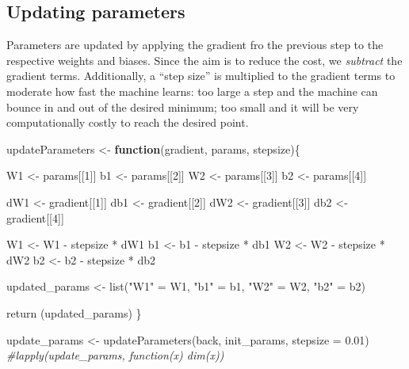 \documentclass[
]{article}
\newenvironment{Shaded}{\begin{snugshade}}{\end{snugshade}}
\newcommand{\AttributeTok}[1]{\textcolor[rgb]{0.77,0.63,0.00}{#1}}
\newcommand{\CommentTok}[1]{\textcolor[rgb]{0.56,0.35,0.01}{\textit{#1}}}
\newcommand{\ControlFlowTok}[1]{\textcolor[rgb]{0.13,0.29,0.53}{\textbf{#1}}}
\newcommand{\DecValTok}[1]{\textcolor[rgb]{0.00,0.00,0.81}{#1}}
\newcommand{\FloatTok}[1]{\textcolor[rgb]{0.00,0.00,0.81}{#1}}
\newcommand{\FunctionTok}[1]{\textcolor[rgb]{0.00,0.00,0.00}{#1}}
\newcommand{\NormalTok}[1]{#1}
\newcommand{\OtherTok}[1]{\textcolor[rgb]{0.56,0.35,0.01}{#1}}
\newcommand{\SpecialCharTok}[1]{\textcolor[rgb]{0.00,0.00,0.00}{#1}}
\newcommand{\StringTok}[1]{\textcolor[rgb]{0.31,0.60,0.02}{#1}}
\begin{document}
\hypertarget{updating-parameters}{%
\subsection{Updating parameters}\label{updating-parameters}}

Parameters are updated by applying the gradient fro the previous step to
the respective weights and biases. Since the aim is to reduce the cost,
we \emph{subtract} the gradient terms. Additionally, a ``step size'' is
multiplied to the gradient terms to moderate how fast the machine
learns: too large a step and the machine can bounce in and out of the
desired minimum; too small and it will be very computationally costly to
reach the desired point.

\begin{Shaded}
\begin{Highlighting}[]
\NormalTok{updateParameters }\OtherTok{\textless{}{-}} \ControlFlowTok{function}\NormalTok{(gradient, params, stepsize)\{}
  
\NormalTok{  W1 }\OtherTok{\textless{}{-}}\NormalTok{ params[[}\DecValTok{1}\NormalTok{]]}
\NormalTok{  b1 }\OtherTok{\textless{}{-}}\NormalTok{ params[[}\DecValTok{2}\NormalTok{]]}
\NormalTok{  W2 }\OtherTok{\textless{}{-}}\NormalTok{ params[[}\DecValTok{3}\NormalTok{]]}
\NormalTok{  b2 }\OtherTok{\textless{}{-}}\NormalTok{ params[[}\DecValTok{4}\NormalTok{]]}
  
\NormalTok{  dW1 }\OtherTok{\textless{}{-}}\NormalTok{ gradient[[}\DecValTok{1}\NormalTok{]]}
\NormalTok{  db1 }\OtherTok{\textless{}{-}}\NormalTok{ gradient[[}\DecValTok{2}\NormalTok{]]}
\NormalTok{  dW2 }\OtherTok{\textless{}{-}}\NormalTok{ gradient[[}\DecValTok{3}\NormalTok{]]}
\NormalTok{  db2 }\OtherTok{\textless{}{-}}\NormalTok{ gradient[[}\DecValTok{4}\NormalTok{]]}
  
\NormalTok{  W1 }\OtherTok{\textless{}{-}}\NormalTok{ W1 }\SpecialCharTok{{-}}\NormalTok{ stepsize }\SpecialCharTok{*}\NormalTok{ dW1}
\NormalTok{  b1 }\OtherTok{\textless{}{-}}\NormalTok{ b1 }\SpecialCharTok{{-}}\NormalTok{ stepsize }\SpecialCharTok{*}\NormalTok{ db1}
\NormalTok{  W2 }\OtherTok{\textless{}{-}}\NormalTok{ W2 }\SpecialCharTok{{-}}\NormalTok{ stepsize }\SpecialCharTok{*}\NormalTok{ dW2}
\NormalTok{  b2 }\OtherTok{\textless{}{-}}\NormalTok{ b2 }\SpecialCharTok{{-}}\NormalTok{ stepsize }\SpecialCharTok{*}\NormalTok{ db2}
  
\NormalTok{  updated\_params }\OtherTok{\textless{}{-}} \FunctionTok{list}\NormalTok{(}\StringTok{"W1"} \OtherTok{=}\NormalTok{ W1,}
                         \StringTok{"b1"} \OtherTok{=}\NormalTok{ b1,}
                         \StringTok{"W2"} \OtherTok{=}\NormalTok{ W2,}
                         \StringTok{"b2"} \OtherTok{=}\NormalTok{ b2)}
  
  \FunctionTok{return}\NormalTok{ (updated\_params)}
\NormalTok{\}}

\NormalTok{update\_params }\OtherTok{\textless{}{-}} \FunctionTok{updateParameters}\NormalTok{(back, init\_params, }\AttributeTok{stepsize =} \FloatTok{0.01}\NormalTok{)}
\CommentTok{\#lapply(update\_params, function(x) dim(x))}
\end{Highlighting}
\end{Shaded}
\end{document}

